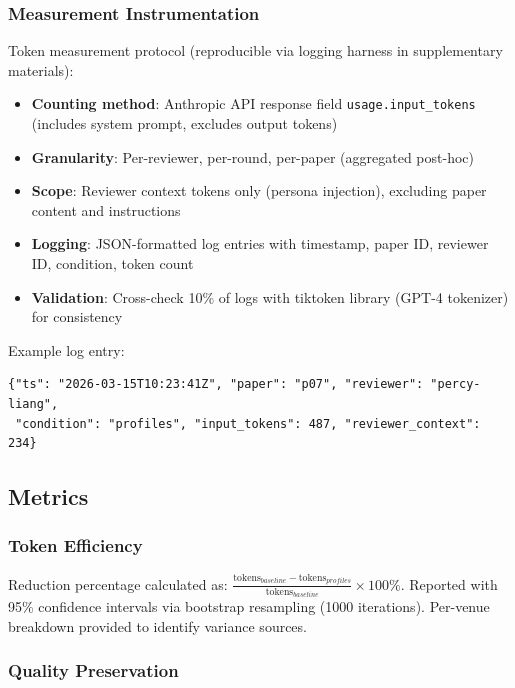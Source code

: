 \subsubsection{Measurement Instrumentation}

Token measurement protocol (reproducible via logging harness in supplementary materials):

\begin{itemize}
\item \textbf{Counting method}: Anthropic API response field \texttt{usage.input\_tokens} (includes system prompt, excludes output tokens)
\item \textbf{Granularity}: Per-reviewer, per-round, per-paper (aggregated post-hoc)
\item \textbf{Scope}: Reviewer context tokens only (persona injection), excluding paper content and instructions
\item \textbf{Logging}: JSON-formatted log entries with timestamp, paper ID, reviewer ID, condition, token count
\item \textbf{Validation}: Cross-check 10\% of logs with tiktoken library (GPT-4 tokenizer) for consistency
\end{itemize}

Example log entry:
\begin{verbatim}
{"ts": "2026-03-15T10:23:41Z", "paper": "p07", "reviewer": "percy-liang",
 "condition": "profiles", "input_tokens": 487, "reviewer_context": 234}
\end{verbatim}

\subsection{Metrics}

\subsubsection{Token Efficiency}

Reduction percentage calculated as: $\frac{\text{tokens}_{baseline} - \text{tokens}_{profiles}}{\text{tokens}_{baseline}} \times 100\%$. Reported with 95\% confidence intervals via bootstrap resampling (1000 iterations). Per-venue breakdown provided to identify variance sources.

\subsubsection{Quality Preservation}

